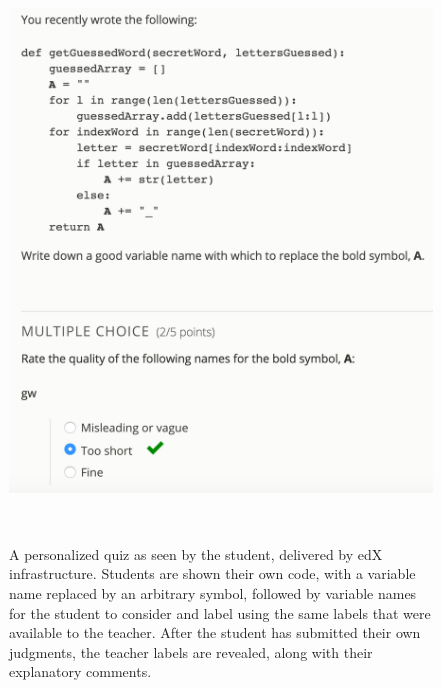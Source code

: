 \begin{figure}
\centering
\includegraphics[width=0.95\columnwidth]{Body/figures/foobaz/feedbackQuizExample.png}
\caption{A personalized quiz as seen by the student, delivered by edX infrastructure. Students are shown their own code, with a variable name replaced by an arbitrary symbol, followed by variable names for the student to consider and label using the same labels that were available to the teacher. After the student has submitted their own judgments, the teacher labels are revealed, along with their explanatory comments.}~\label{fig:figure4}
\end{figure}

